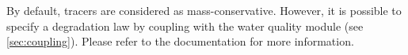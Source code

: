 By default,  tracers are considered as mass-conservative.
However, it is possible to specify a degradation law
by coupling  with the \waqtel water quality module
(see \ref{sec:coupling}).
Please refer to the \waqtel documentation for more information.




